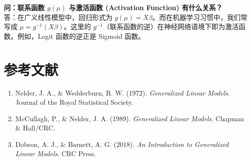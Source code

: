 \documentclass[12pt, a4paper]{article}
\begin{document}
\textbf{问：联系函数 $g(\mu)$ 与激活函数 (Activation Function) 有什么关系？}\\
答：在广义线性模型中，回归形式为 $g(\mu) = X\beta$。而在机器学习习惯中，我们常写成 $\mu = g^{-1}(X\beta)$。这里的 $g^{-1}$（联系函数的逆）在神经网络语境下即为激活函数。例如，Logit 函数的逆正是 Sigmoid 函数。

\section{参考文献}
\begin{enumerate}
    \item Nelder, J. A., \& Wedderburn, R. W. (1972). \textit{Generalized Linear Models}. Journal of the Royal Statistical Society.
    \item McCullagh, P., \& Nelder, J. A. (1989). \textit{Generalized Linear Models}. Chapman \& Hall/CRC.
    \item Dobson, A. J., \& Barnett, A. G. (2018). \textit{An Introduction to Generalized Linear Models}. CRC Press.
\end{enumerate}
\end{document}
